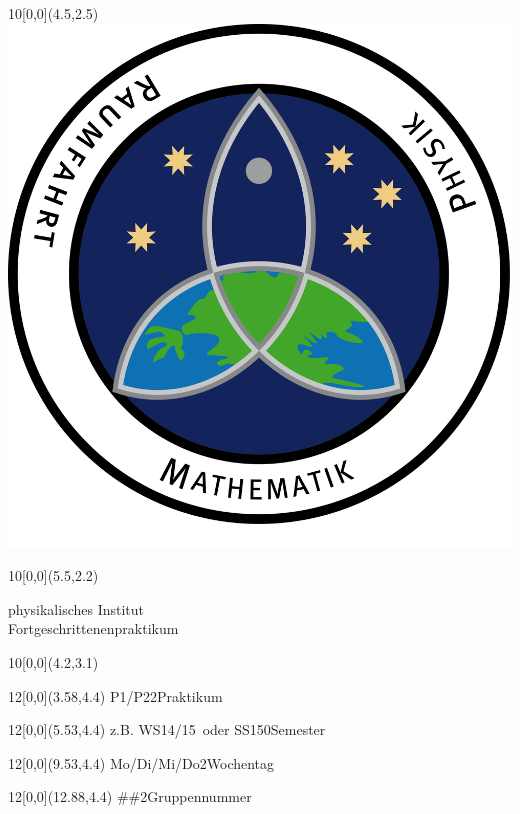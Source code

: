 \newcommand{\diameter}{20}
\newcommand{\xone}{-15}
\newcommand{\xtwo}{160}
\newcommand{\yone}{15}
\newcommand{\ytwo}{-253}

\newcommand{\hoehea}{60}
\newcommand{\hoeheb}{60}




\begin{titlepage}
    
    \begin{textblock}{10}[0,0](4.5,2.5)
        \includegraphics[width=.15\textwidth]{include/Logo_Fachschaft.png}
    \end{textblock}
    \begin{textblock}{10}[0,0](5.5,2.2)
        \begin{flushright}
            \Large physikalisches Institut\\Fortgeschrittenenpraktikum
        \end{flushright}
    \end{textblock}
    
    \begin{textblock}{10}[0,0](4.2,3.1)
    \end{textblock}
    
    \Large
    \begin{textblock}{12}[0,0](3.58,4.4)
                    {P1/P2}{2}{Praktikum}
    \end{textblock}
    \begin{textblock}{12}[0,0](5.53,4.4)
        {z.B. \glqq WS14/15\grqq\ oder \glqq SS15\grqq}{0}{Semester}
    \end{textblock}
    \begin{textblock}{12}[0,0](9.53,4.4)
                    {Mo/Di/Mi/Do}{2}{Wochentag}
    \end{textblock}
    \begin{textblock}{12}[0,0](12.88,4.4)
                   {\#\#}{2}{Gruppennummer}
    \end{textblock}
    

\end{titlepage}
